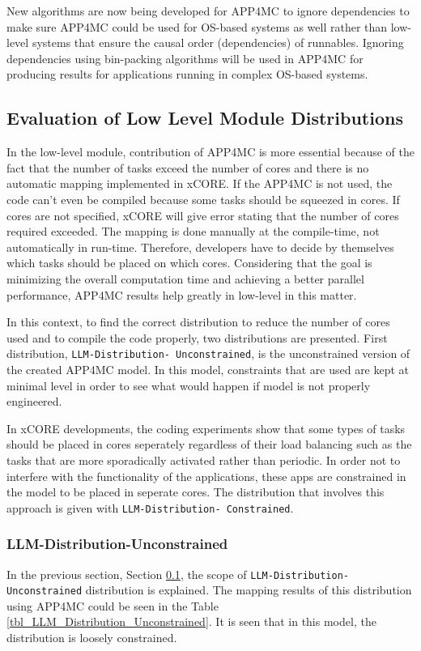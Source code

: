 New algorithms are now being developed for APP4MC to ignore dependencies to make sure APP4MC could be used for OS-based systems as well rather than low-level systems that ensure the causal order (dependencies) of runnables. Ignoring dependencies using bin-packing algorithms \cite{binpacking} will be used in APP4MC for producing results for applications running in complex OS-based systems.

\subsection{Evaluation of Low Level Module Distributions} \label{sectionlldistr}

In the low-level module, contribution of APP4MC is more essential because of the fact that the number of tasks exceed the number of cores and there is no automatic mapping implemented in xCORE. If the APP4MC is not used, the code can't even be compiled because some tasks should be squeezed in cores. If cores are not specified, xCORE will give error stating that the number of cores required exceeded. The mapping is done manually at the compile-time, not automatically in run-time. Therefore, developers have to decide by themselves which tasks should be placed on which cores. Considering that the goal is minimizing the overall computation time and achieving a better parallel performance, APP4MC results help greatly in low-level in this matter.

In this context, to find the correct distribution to reduce the number of cores used and to compile the code properly, two distributions are presented. First distribution, \texttt{LLM-Distribution- Unconstrained}, is the unconstrained version of the created APP4MC model. In this model, constraints that are used are kept at minimal level in order to see what would happen if model is not properly engineered. 

In xCORE developments, the coding experiments show that some types of tasks should be placed in cores seperately regardless of their load balancing such as the tasks that are more sporadically activated rather than periodic. In order not to interfere with the functionality of the applications, these apps are constrained in the model to be placed in seperate cores. The distribution that involves this approach is given with \texttt{LLM-Distribution- Constrained}.

\subsubsection{LLM-Distribution-Unconstrained}
In the previous section, Section \ref{sectionlldistr}, the scope of \texttt{LLM-Distribution-Unconstrained} distribution is explained. The mapping results of this distribution using APP4MC could be seen in the Table \ref{tbl_LLM_Distribution_Unconstrained}. It is seen that in this model, the distribution is loosely constrained.

